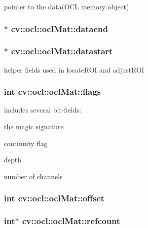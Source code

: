 pointer to the data(\-O\-C\-L memory object) 

\hypertarget{classcv_1_1ocl_1_1oclMat_a0fd49cee884addef5f6302a7246be445}{
\subsubsection[{dataend}]{$\ast$ cv\-::ocl\-::ocl\-Mat\-::dataend}}\label{classcv_1_1ocl_1_1oclMat_a0fd49cee884addef5f6302a7246be445}
\hypertarget{classcv_1_1ocl_1_1oclMat_a475b64df881ea635c8990837c5bf5822}{
\subsubsection[{datastart}]{$\ast$ cv\-::ocl\-::ocl\-Mat\-::datastart}}\label{classcv_1_1ocl_1_1oclMat_a475b64df881ea635c8990837c5bf5822}


helper fields used in locate\-R\-O\-I and adjust\-R\-O\-I 

\hypertarget{classcv_1_1ocl_1_1oclMat_ae53eaacd0018d7b762a5c69c9a1d0d5f}{
\subsubsection[{flags}]{\setlength{\rightskip}{0pt plus 5cm}int cv\-::ocl\-::ocl\-Mat\-::flags}}\label{classcv_1_1ocl_1_1oclMat_ae53eaacd0018d7b762a5c69c9a1d0d5f}
includes several bit-\/fields\-:
\begin{DoxyItemize}
\item the magic signature
\item continuity flag
\item depth
\item number of channels 
\end{DoxyItemize}\hypertarget{classcv_1_1ocl_1_1oclMat_a65fd2fd0e6f224bd577ae9a28cad2097}{
\subsubsection[{offset}]{\setlength{\rightskip}{0pt plus 5cm}int cv\-::ocl\-::ocl\-Mat\-::offset}}\label{classcv_1_1ocl_1_1oclMat_a65fd2fd0e6f224bd577ae9a28cad2097}
\hypertarget{classcv_1_1ocl_1_1oclMat_a5209f38351516306c7e045fea768ae41}{
\subsubsection[{refcount}]{\setlength{\rightskip}{0pt plus 5cm}int$\ast$ cv\-::ocl\-::ocl\-Mat\-::refcount}}\label{classcv_1_1ocl_1_1oclMat_a5209f38351516306c7e045fea768ae41}


